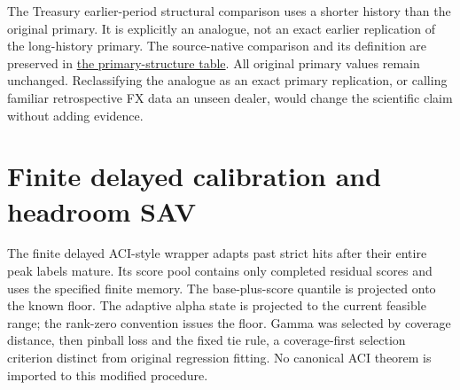 \documentclass[11pt,a4paper]{article}
\begin{document}
The Treasury earlier-period structural comparison uses a shorter
history than the original primary. It is explicitly an analogue, not an exact
earlier replication of the long-history primary. The source-native comparison
and its definition are preserved in
\href{https://github.com/ByronLi0207/financial-mathematics-paper-20261020/blob/revision-v7-final/results/supervisor-20261023/r6/primary-replication.csv}{the primary-structure table}.
All original primary values remain unchanged. Reclassifying the analogue as an
exact primary replication, or calling familiar retrospective FX data an unseen
dealer, would change the scientific claim without adding evidence.\section{Finite delayed calibration and headroom SAV}\label{sup:wp2}

The finite delayed ACI-style wrapper adapts past strict hits after
their entire peak labels mature. Its score pool contains only completed residual
scores and uses the specified finite memory. The base-plus-score quantile is
projected onto the known floor. The adaptive alpha state is projected to the
current feasible range; the rank-zero convention issues the floor. Gamma was
selected by coverage distance, then pinball loss and the fixed tie rule, a
coverage-first selection criterion distinct from original regression fitting.
No canonical ACI theorem is imported to this modified procedure.
\end{document}
